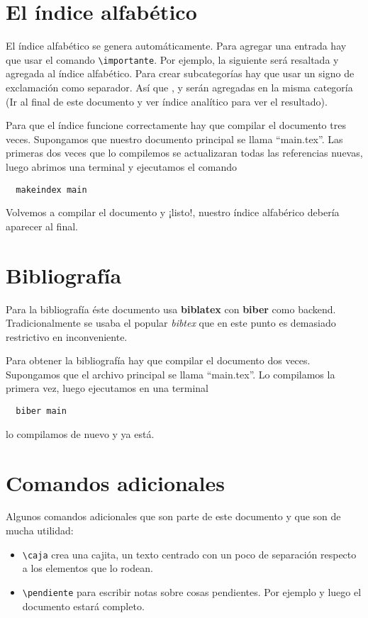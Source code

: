 \documentclass[11pt, twoside]{book}
\begin{document}
\section{El índice alfabético}
El índice alfabético se genera automáticamente. Para agregar una entrada hay que
usar el comando \verb|\importante|. Por ejemplo, la siguiente
 será resaltada y agregada al índice alfabético. Para crear
subcategorías hay que usar un signo de exclamación como separador. Así que
,  y
 serán agregadas en la misma categoría (Ir al final
de este documento y ver índice analítico para ver el resultado).

Para que el índice funcione correctamente hay que compilar el documento tres
veces. Supongamos que nuestro documento principal se llama ``main.tex''. Las
primeras dos veces que lo compilemos se actualizaran todas las referencias
nuevas, luego abrimos una terminal y ejecutamos el comando

\begin{verbatim}
  makeindex main
\end{verbatim}

Volvemos a compilar el documento y ¡listo!, nuestro índice alfabérico debería
aparecer al final.

\section{Bibliografía}
Para la bibliografía éste documento usa \textbf{biblatex} con \textbf{biber}
como backend. Tradicionalmente se usaba el popular \textit{bibtex} que en este
punto es demasiado restrictivo en inconveniente. 

Para obtener la bibliografía hay que compilar el documento dos veces.
Supongamos que el archivo principal se llama ``main.tex''. Lo compilamos la
primera vez, luego ejecutamos en una terminal

\begin{verbatim}
  biber main
\end{verbatim}

lo compilamos de nuevo y ya está.

\section{Comandos adicionales}
Algunos comandos adicionales que son parte de este documento y que son de mucha
utilidad:

\begin{itemize}
  \item \verb|\caja| crea una cajita, un texto centrado con un poco de
    separación respecto a los elementos que lo rodean.
  \item \verb|\pendiente| para escribir notas sobre cosas pendientes.
    Por ejemplo  y luego el documento
    estará completo.
\end{itemize}
\end{document}
